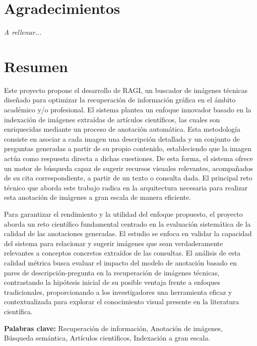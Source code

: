\documentclass[a4paper]{report}
\begin{document}
\chapter*{Agradecimientos}
\begin{flushright}
\textit{A rellenar...}
\end{flushright}

\chapter*{Resumen}
Este proyecto propone el desarrollo de RAGI, un buscador de imágenes técnicas diseñado para optimizar la recuperación de información gráfica en el ámbito académico y/o profesional. El sistema plantea un enfoque innovador basado en la indexación de imágenes extraídas de artículos científicos, las cuales son enriquecidas mediante un proceso de anotación automática. Esta metodología consiste en asociar a cada imagen una descripción detallada y un conjunto de preguntas generadas a partir de su propio contenido, estableciendo que la imagen actúa como respuesta directa a dichas cuestiones. De esta forma, el sistema ofrece un motor de búsqueda capaz de sugerir recursos visuales relevantes, acompañados de su cita correspondiente, a partir de un texto o consulta dada. El principal reto técnico que aborda este trabajo radica en la arquitectura necesaria para realizar esta anotación de imágenes a gran escala de manera eficiente.

Para garantizar el rendimiento y la utilidad del enfoque propuesto, el proyecto aborda un reto científico fundamental centrado en la evaluación sistemática de la calidad de las anotaciones generadas. El estudio se enfoca en validar la capacidad del sistema para relacionar y sugerir imágenes que sean verdaderamente relevantes a conceptos concretos extraídos de las consultas. El análisis de esta calidad métrica busca evaluar el impacto del modelo de anotación basado en pares de descripción-pregunta en la recuperación de imágenes técnicas, contrastando la hipótesis inicial de su posible ventaja frente a enfoques tradicionales, proporcionando a los investigadores una herramienta eficaz y contextualizada para explorar el conocimiento visual presente en la literatura científica.

\textbf{Palabras clave:} Recuperación de información, Anotación de imágenes, Búsqueda semántica, Artículos científicos, Indexación a gran escala.
\end{document}
